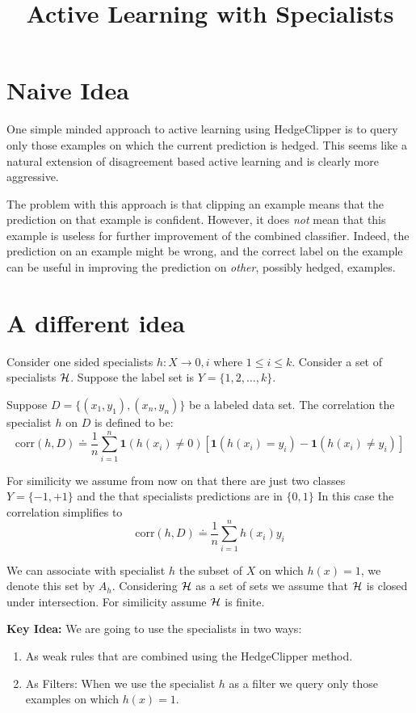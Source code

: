 \documentclass{article}[12pt]
\title{Active Learning with Specialists}
\begin{document}
\maketitle

\section{Naive Idea}

One simple minded approach to active learning using HedgeClipper is to
query only those examples on which the current prediction is
hedged. This seems like a natural extension of disagreement based
active learning and is clearly more aggressive.

The problem with this approach is that clipping an example means that
the prediction on that example is confident. However, it does {\em
  not} mean that this example is useless for further improvement of
the combined classifier. Indeed, the prediction on an example might be
wrong, and the correct label on the example can be useful in improving
the prediction on {\em other}, possibly hedged, examples.

\section{A different idea}

\newcommand{\HH}{{\cal H}}
\newcommand{\GG}{{\cal G}}
\newcommand{\corr}{\mbox{corr}}
\newcommand{\ind}{{\mathbf 1}}

Consider one sided specialists $h:X \to {0,i}$ where $1\leq i \leq
k$. Consider a set of specialists $\HH$. Suppose the label set is
$Y=\{1,2,\ldots,k\}$.

Suppose $D=\{(x_1,y_1),(x_n,y_n)\}$ be a labeled data set. The
correlation the specialist $h$ on  $D$ is defined to be:
\[
\corr(h,D) \doteq \frac{1}{n} \sum_{i=1}^n \ind(h(x_i)\neq 0) 
\left[ \ind(h(x_i) = y_i) - \ind(h(x_i) \neq y_i) \right]
\]

For similicity we assume from now on that there are just two classes 
$Y=\{-1,+1\}$ and the that specialists predictions are in $\{0,1\}$
In this case the correlation simplifies to
\[
\corr(h,D) \doteq \frac{1}{n} \sum_{i=1}^n h(x_i) y_i
\]

We can associate with specialist $h$ the subset of $X$ on which
$h(x)=1$, we denote this set by $A_h$. Considering $\HH$ as a set of
sets we assume that $\HH$ is closed under intersection. For similicity
assume  $\HH$  is finite.

{\bf Key Idea:} We are going to use the specialists in two ways:
\begin{enumerate}
\item As weak rules that are combined using the HedgeClipper method.
\item As Filters: When we use the specialist $h$ as a filter we query
  only those examples on which $h(x)=1$.
\end{enumerate}
\end{document}
